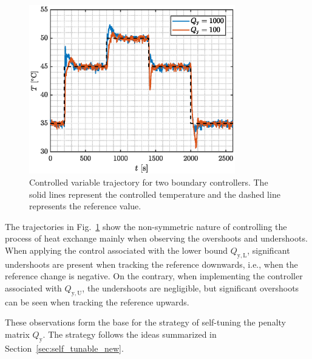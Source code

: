 \documentclass[preprint,12pt]{elsarticle}
\begin{document}
\begin{figure}
	\begin{center}
		\includegraphics[width=0.8\textwidth]{images/CV_boundaries}
		\caption{Controlled variable trajectory for two boundary controllers. The solid lines represent the controlled temperature and the dashed line represents the reference value.}
		\label{fig:CV_boundaries}
	\end{center}
\end{figure}

The trajectories in Fig.~\ref{fig:CV_boundaries} show the non-symmetric nature of controlling the process of heat exchange mainly when observing the overshoots and undershoots. When applying the control associated with the lower bound $Q_\mathrm{y, L}$, significant undershoots are present when tracking the reference downwards, i.e., when the reference change is negative. On the contrary, when implementing the controller associated with $Q_\mathrm{y, U}$, the undershoots are negligible, but significant overshoots can be seen when tracking the reference upwards.

These observations form the base for the strategy of self-tuning the penalty matrix $Q_\mathrm{y}$. The strategy follows the ideas summarized in Section~\ref{sec:self_tunable_new}.
\end{document}
